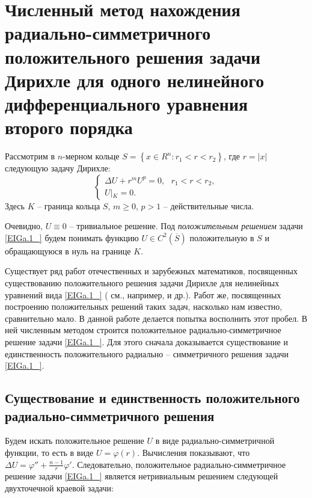 \section{Численный метод нахождения радиально-симметричного положительного решения задачи Дирихле для одного нелинейного дифференциального уравнения второго порядка}



Рассмотрим в $n$-мерном кольце $S=\left\{x\in R^{n} :r_{1} <r<r_{2} \right\}$, где $r=\left|x\right|$ следующую задачу Дирихле:
\begin{equation}
\label{EIGa.1_}
\left\{\begin{array}{l} {\Delta U+r^{m} U^{p} =0,\, \, \, \, r_{1} <r<r_{2} ,} \\ {U\left|_{K} = 0.\right. } \end{array}\right. \end{equation}
Здесь  $K$ -- граница кольца $S$, $m\ge 0$, $p>1$ -- действительные числа.

Очевидно, $U\equiv 0$ -- тривиальное решение. Под \textit{положительным решением} задачи \eqref{EIGa.1_} будем понимать функцию $U\in C^2\left(\overline{S}\right)$ положительную в $S$ и обращающуюся в нуль на границе $K$.

Существует ряд работ отечественных и зарубежных математиков, посвященных существованию положительного решения задачи Дирихле для нелинейных уравнений вида \eqref{EIGa.1_} ( см., например, \cite{pohojOvs, galahov, gidasSpruck, kuoShung, pohojIntSolve, DancerNorman, KavanoNichiro, JiangJu, abdurag5, abdurag1, bahvalov, abdurag6} и др.). Работ же, посвященных построению положительных решений таких задач, насколько нам известно, сравнительно мало. В данной работе делается попытка восполнить этот пробел. В ней численным методом строится положительное радиально-симметричное решение задачи \eqref{EIGa.1_}. Для этого сначала доказывается существование и единственность положительного радиально -- симметричного решения задачи \eqref{EIGa.1_}.

\subsection{Существование и единственность положительного радиально-симметричного решения}

Будем искать положительное решение $U$ в виде радиально-симметричной функции, то есть в виде $U=\varphi \left(r\right)$.
Вычисления показывают, что $\Delta U=\varphi ''+\frac{n-1}{r} \varphi '$.
Следовательно, положительное радиально-симметричное решение задачи \eqref{EIGa.1_} является нетривиальным решением следующей двухточечной краевой задачи:


